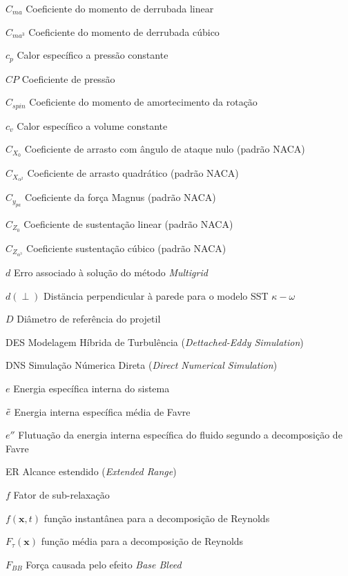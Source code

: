 \begin{siglas}
    \item[\(C_{ma}\)] Coeficiente do momento de derrubada linear
    \item[\(C_{ma^3}\)] Coeficiente do momento de derrubada cúbico
    \item[\(c_p\)] Calor específico a pressão constante
    \item[\(CP\)] Coeficiente de pressão
    \item[\(C_{spin}\)] Coeficiente do momento de amortecimento da rotação
    \item[\(c_v\)] Calor específico a volume constante
    \item[\(C_{X_0}\)] Coeficiente de arrasto com ângulo de ataque nulo (padrão NACA)
    \item[\(C_{X_{\alpha^2}}\)] Coeficiente de arrasto quadrático (padrão NACA)
    \item[\(C_{y_{pa}}\)] Coeficiente da força Magnus (padrão NACA)
    \item[\(C_{Z_0}\)] Coeficiente de sustentação linear (padrão NACA)
    \item[\(C_{Z_{\alpha^3}}\)] Coeficiente sustentação cúbico (padrão NACA)
    \item[\(d\)] Erro associado à solução do método \textit{Multigrid}
    \item[\(d(\perp)\)] Distäncia perpendicular à parede para o modelo SST \(\kappa-\omega\)
    \item[\(D\)] Diâmetro de referência do projetil
    \item[DES] Modelagem Híbrida de Turbulência (\textit{Dettached-Eddy Simulation})
    \item[DNS] Simulação Númerica Direta (\textit{Direct Numerical Simulation})
    \item[\(e\)] Energia específica interna do sistema
    \item[\(\Tilde{e}\)] Energia interna específica média de Favre
    \item[\(e''\)] Flutuação da energia interna específica do fluido segundo a decomposição de Favre
    \item[ER] Alcance estendido (\textit{Extended Range})
    \item[\(f\)] Fator de sub-relaxação
    \item[\(f(\textbf{x},t)\)] função instantânea para a decomposição de Reynolds
    \item[\(F_{\tau}(\textbf{x})\)] função média para a decomposição de Reynolds
    \item[\(F_{BB}\)] Força causada pelo efeito \textit{Base Bleed}

\end{siglas}
